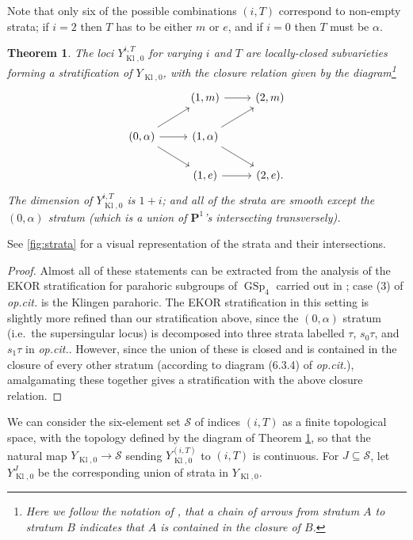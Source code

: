 \documentclass[cjm]{ipart}
\theoremstyle{plain}
\newtheorem{theorem}{Theorem}[subsection]
\theoremstyle{remark}
\DeclareMathOperator{\GSp}{GSp}
\DeclareMathOperator{\Kl}{Kl}
\newcommand{\cS}{\mathcal{S}}
\numberwithin{equation}{subsection}
\begin{document}
  Note that only six of the possible combinations $(i, T)$ correspond to non-empty strata; if $i = 2$ then $T$ has to be either $m$ or $e$, and if $i = 0$ then $T$ must be $\alpha$.

  \begin{theorem}\label{thm:Klingenstrata1}
   The loci $Y_{\Kl, 0}^{i, T}$ for varying $i$ and $T$ are locally-closed subvarieties forming a stratification of $Y_{\Kl, 0}$, with the closure relation given by the diagram\footnote{Here we follow the notation of \cite{shenyuzhang21}, that a chain of arrows from stratum $A$ to stratum $B$ indicates that $A$ is contained in the closure of $B$.}
   \[
    \begin{tikzcd}
                 & (1, m)     \rar & (2, m)\\
     (0, \alpha) \ar[r]\ar[ru]\ar[rd] & (1, \alpha) \ar[ru] \ar[rd]\\
                 & (1, e)     \rar & (2, e).
    \end{tikzcd}
   \]
   The dimension of $Y^{i, T}_{\Kl, 0}$ is $1 + i$; and all of the strata are smooth except the $(0, \alpha)$ stratum (which is a union of $\mathbf{P}^1$'s intersecting transversely).
  \end{theorem}

  See \cref{fig:strata} for a visual representation of the strata and their intersections.

  \begin{proof}
   Almost all of these statements can be extracted from the analysis of the EKOR stratification for parahoric subgroups of $\GSp_4$ carried out in \cite[\S 6.3]{shenyuzhang21}; case (3) of \emph{op.cit.} is the Klingen parahoric. The EKOR stratification in this setting is slightly more refined than our stratification above, since the $(0, \alpha)$ stratum (i.e.~the supersingular locus) is decomposed into three strata labelled $\tau$, $s_0 \tau$, and $s_1 \tau$ in \emph{op.cit.}. However, since the union of these is closed and is contained in the closure of every other stratum (according to diagram (6.3.4) of \emph{op.cit.}), amalgamating these together gives a stratification with the above closure relation.
  \end{proof}

  We can consider the six-element set $\mathcal{S}$ of indices $(i, T)$ as a finite topological space, with the topology defined by the diagram of Theorem \ref{thm:Klingenstrata1}, so that the natural map $Y_{\Kl, 0} \to \mathcal{S}$ sending $Y^{(i, T)}_{\Kl, 0}$ to $(i, T)$ is continuous. For $J \subseteq \cS$, let $Y_{\Kl, 0}^J$ be the corresponding union of strata in $Y_{\Kl, 0}$.
\end{document}
